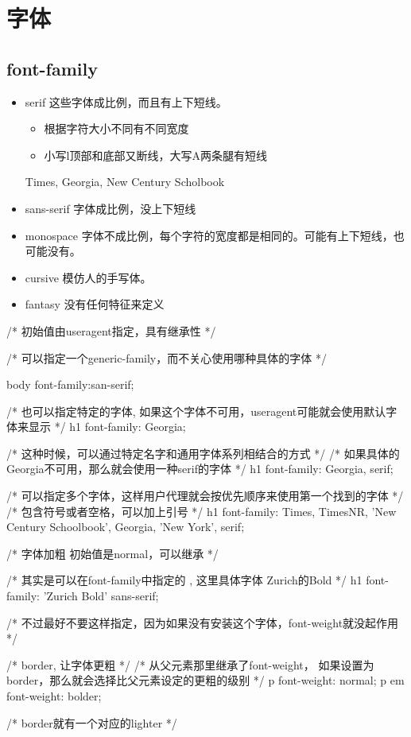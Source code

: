 \section{字体}

\subsection{font-family}

\begin{itemize}
\item serif 这些字体成比例，而且有上下短线。
\begin{itemize}
\item 根据字符大小不同有不同宽度
\item 小写l顶部和底部又断线，大写A两条腿有短线
\end{itemize}
Times, Georgia, New Century Scholbook
\item sans-serif 字体成比例，没上下短线
\item monospace 字体不成比例，每个字符的宽度都是相同的。可能有上下短线，也可能没有。
\item cursive 模仿人的手写体。
\item fantasy 没有任何特征来定义
\end{itemize}

\begin{CSS}

/* 初始值由useragent指定，具有继承性 */

/* 可以指定一个generic-family，而不关心使用哪种具体的字体 */

body { font-family:san-serif;}

/* 也可以指定特定的字体, 如果这个字体不可用，useragent可能就会使用默认字体来显示 */
h1 { font-family: Georgia; }

/* 这种时候，可以通过特定名字和通用字体系列相结合的方式 */
/* 如果具体的Georgia不可用，那么就会使用一种serif的字体 */
h1 {font-family: Georgia, serif; }

/* 可以指定多个字体，这样用户代理就会按优先顺序来使用第一个找到的字体 */
/* 包含符号或者空格，可以加上引号 */
h1 {font-family: Times, TimesNR, 'New Century Schoolbook', Georgia, 'New York', serif; }
\end{CSS}

\begin{CSS}

/* 字体加粗 初始值是normal，可以继承 */

/* 其实是可以在font-family中指定的 , 这里具体字体 Zurich的Bold */
h1 {font-family: 'Zurich Bold' sans-serif; }

/* 不过最好不要这样指定，因为如果没有安装这个字体，font-weight就没起作用 */

/* border, 让字体更粗 */
/* 从父元素那里继承了font-weight， 如果设置为border，那么就会选择比父元素设定的更粗的级别 */
p { font-weight: normal; }
p em { font-weight: bolder; }


/* border就有一个对应的lighter */

\end{CSS}

